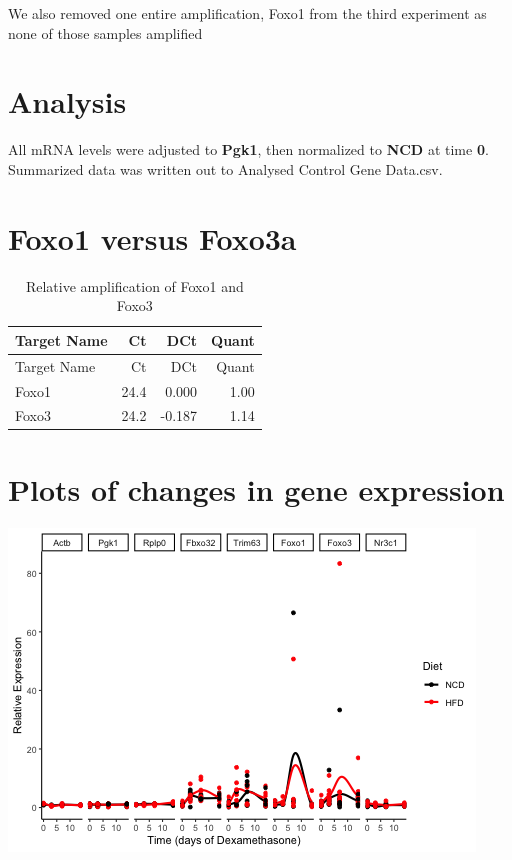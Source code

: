 \documentclass[]{article}
\begin{document}
We also removed one entire amplification, Foxo1 from the third
experiment as none of those samples amplified

\section{Analysis}\label{analysis}

All mRNA levels were adjusted to \textbf{Pgk1}, then normalized to
\textbf{NCD} at time \textbf{0}. Summarized data was written out to
Analysed Control Gene Data.csv.

\section{Foxo1 versus Foxo3a}\label{foxo1-versus-foxo3a}

\begin{longtable}[]{@{}lrrr@{}}
\caption{Relative amplification of Foxo1 and Foxo3}\tabularnewline
\toprule
Target Name & Ct & DCt & Quant\tabularnewline
\midrule
\endfirsthead
\toprule
Target Name & Ct & DCt & Quant\tabularnewline
\midrule
\endhead
Foxo1 & 24.4 & 0.000 & 1.00\tabularnewline
Foxo3 & 24.2 & -0.187 & 1.14\tabularnewline
\bottomrule
\end{longtable}

\section{Plots of changes in gene
expression}\label{plots-of-changes-in-gene-expression}

\includegraphics{figures/lineplot-all-points-1.png}
\end{document}
